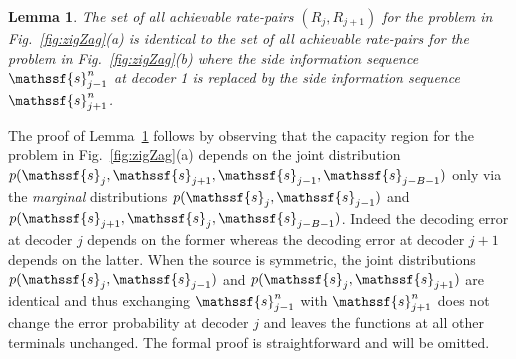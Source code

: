 \documentclass[journal, twocolumn, 10pt]{IEEEtran}
\newtheorem{lemma}{Lemma}
\newcommand{\rvs}{{\mathssf{s}}}    %
\begin{document}
\begin{lemma}
The set of all achievable rate-pairs $(R_j, R_{j+1})$ for the problem in Fig.~\ref{fig:zigZag}(a) is identical to the set of all achievable rate-pairs for the problem in Fig.~\ref{fig:zigZag}(b)
where the side information sequence $\rvs_{j-1}^n$ at decoder 1 is replaced by the side information sequence $\rvs_{j+1}^n$.
\label{lem:SI}
\end{lemma}

The proof of Lemma~\ref{lem:SI} follows by observing that the capacity region for the problem in Fig.~\ref{fig:zigZag}(a) depends on the joint distribution $p(\rvs_j, \rvs_{j+1}, \rvs_{j-1},\rvs_{j-B-1})$ only via the {\em marginal}
distributions $p(\rvs_j, \rvs_{j-1})$ and $p(\rvs_{j+1}, \rvs_j, \rvs_{j-B-1})$.  Indeed the decoding error at decoder $j$ depends on the former whereas the decoding error at decoder ${j+1}$ depends on the latter. When the source is symmetric,  the joint distributions $p(\rvs_j, \rvs_{j-1})$ and $p(\rvs_j, \rvs_{j+1})$ are identical and thus exchanging $\rvs_{j-1}^n$ with $\rvs_{j+1}^n$ does not change the error probability at decoder $j$ and leaves the functions at all other terminals unchanged. The formal proof is straightforward and will be omitted. 
\end{document}
